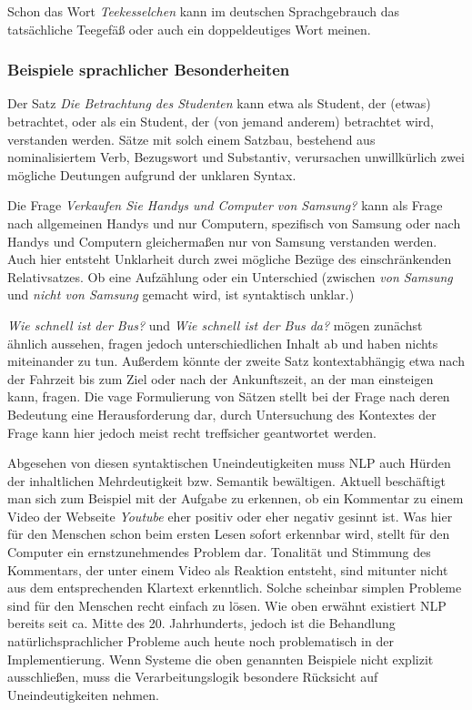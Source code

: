 \documentclass[12pt]{report}
\begin{document}
Schon das Wort \textit{Teekesselchen} kann im deutschen Sprachgebrauch das tatsächliche Teegefäß oder auch ein doppeldeutiges Wort meinen. 
\subsubsection{Beispiele sprachlicher Besonderheiten}

Der Satz \textit{\glqq   Die Betrachtung des Studenten\grqq{}} kann etwa als Student, der (etwas) betrachtet, oder als ein Student, der (von jemand anderem) betrachtet wird, verstanden werden. Sätze mit solch einem Satzbau, bestehend aus nominalisiertem Verb, Bezugswort und Substantiv, verursachen unwillkürlich zwei mögliche Deutungen aufgrund der unklaren Syntax.

Die Frage \textit{\glqq  Verkaufen Sie Handys und Computer von Samsung?\grqq{}} kann als Frage nach allgemeinen Handys und nur Computern, spezifisch von Samsung oder nach Handys und Computern gleichermaßen nur von Samsung verstanden werden. Auch hier entsteht Unklarheit durch zwei mögliche Bezüge des einschränkenden Relativsatzes. Ob eine Aufzählung oder ein Unterschied (zwischen \textit{von Samsung} und \textit{nicht von Samsung} gemacht wird, ist syntaktisch unklar.)

\textit{\glqq  Wie schnell ist der Bus?\grqq{}} und \textit{\glqq  Wie schnell ist der Bus da?\grqq{}} mögen zunächst ähnlich aussehen, fragen jedoch unterschiedlichen Inhalt ab und haben nichts miteinander zu tun. Außerdem könnte der zweite Satz kontextabhängig etwa nach der Fahrzeit bis zum Ziel oder nach der Ankunftszeit, an der man einsteigen kann, fragen. Die vage Formulierung von Sätzen stellt bei der Frage nach deren Bedeutung eine Herausforderung dar, durch Untersuchung des Kontextes der Frage kann hier jedoch meist recht treffsicher geantwortet werden.

Abgesehen von diesen syntaktischen Uneindeutigkeiten muss NLP auch Hürden der inhaltlichen Mehrdeutigkeit bzw. Semantik bewältigen. Aktuell beschäftigt man sich zum Beispiel mit der Aufgabe zu erkennen, ob ein Kommentar zu einem Video der Webseite \textit{Youtube} eher positiv oder eher negativ gesinnt ist. Was hier für den Menschen schon beim ersten Lesen sofort erkennbar wird, stellt für den Computer ein ernstzunehmendes Problem dar. Tonalität und Stimmung des Kommentars, der unter einem Video als Reaktion entsteht, sind mitunter nicht aus dem entsprechenden Klartext erkenntlich. 
Solche scheinbar simplen Probleme sind für den Menschen recht einfach zu lösen. Wie oben erwähnt existiert NLP bereits seit ca. Mitte des 20. Jahrhunderts, jedoch ist die Behandlung natürlichsprachlicher Probleme auch heute noch problematisch in der Implementierung. Wenn Systeme die oben genannten Beispiele nicht explizit ausschließen, muss die Verarbeitungslogik besondere Rücksicht auf Uneindeutigkeiten nehmen.
\end{document}
